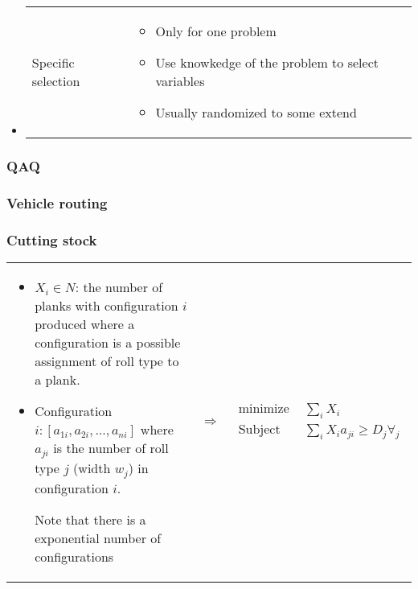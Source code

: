 \begin{itemize}
\begin{itemize}
        \item \begin{tabular}{m{3cm}m{10cm}}
                    Specific selection &
                \begin{itemize}
                    \item Only for one problem
                    \item Use knowkedge of the problem to select variables
                    \item Usually randomized to some extend
                \end{itemize}
            \end{tabular}
        \end{itemize}
\end{itemize}

\subsubsection{QAQ}

\subsubsection{Vehicle routing}

\subsubsection{Cutting stock}

\begin{tabular}{m{10cm}cm{6cm}}
\begin{itemize}
        \item $X_i \in N$: the number of planks with configuration $i$
            produced where a configuration is a possible assignment of
            roll type to a plank.

        \item Configuration $i: [a_{1i}, a_{2i}, ..., a_{ni}]$ where
            $a_{ji}$ is the number of roll type $j$ (width $w_j$) in
            configuration $i$.

                Note that there is a exponential number of
                configurations
                \end{itemize}
                & $\Rightarrow$ & 
                \begin{eqnarray*}
                    \textrm{minimize } & \sum_i X_i \\
                    \textrm{Subject to } & \sum_i X_i a_{ji} \geq D_j
                    \forall_j
                    \end{eqnarray*}
                    \end{tabular}









